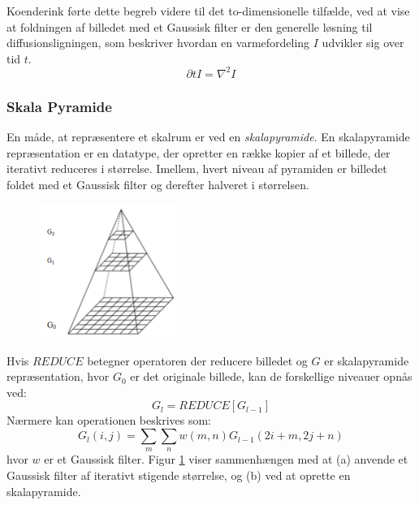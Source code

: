 Koenderink \cite{koen} førte dette begreb videre til det to-dimensionelle tilfælde, ved at vise at foldningen af billedet med et Gaussisk filter er den generelle løsning til diffusionsligningen, som beskriver hvordan en varmefordeling $I$ udvikler sig over tid $t$.
$$ \partial t I = \nabla^2I $$
\subsubsection*{Skala Pyramide}
En måde, at repræsentere et skalrum er ved en \textit{skalapyramide}. En skalapyramide repræsentation er en datatype, der opretter en række kopier af et billede, der iterativt reduceres i størrelse. Imellem, hvert niveau af pyramiden er billedet foldet med et Gaussisk filter og derefter halveret i størrelsen.
\begin{figure}[H]
    \centering
    \includegraphics[width=0.40\textwidth]{fig/40.png}
     \vspace{-1em}
    \begin{center}    
       \caption{\textcolor{gray}{\footnotesize \textit{ }}}
    \label{fig:scalerepdiff}
     \end{center}
     \vspace{-2.5em}
  \end{figure} \noindent
Hvis $REDUCE$ betegner operatoren der reducere billedet og $G$ er skalapyramide repræsentation, hvor $G_0$ er det originale billede, kan de forskellige niveauer opnås ved:
\begin{equation}
G_l =REDUCE[G_{l-1}]
\end{equation}
Nærmere kan operationen beskrives som:
\begin{equation}
G_l(i,j)=\sum\limits_{m}\sum\limits_{n}w(m,n)G_{l-1}(2i+m,2j+n)
\end{equation}
hvor $w$ er et Gaussisk filter. Figur \ref{fig:scalerepdiff} viser sammenhængen med at (a) anvende et Gaussisk filter af iterativt stigende størrelse, og (b) ved at oprette en skalapyramide.
